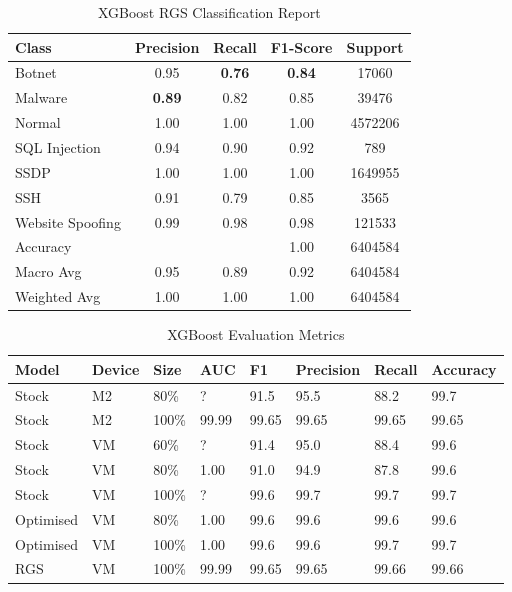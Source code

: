 \begin{table}[htbp]
  \centering
  \caption{XGBoost RGS Classification Report}
  \label{tab:optimised_xgboost}
    \begin{tabular}{lcccc}
    \toprule
    Class & Precision & Recall & F1-Score & Support \\
    \midrule
    Botnet & 0.95 & {\color{red}\bfseries 0.76} & {\color{red}\bfseries 0.84} & 17060 \\
    Malware & {\color{red}\bfseries 0.89} & 0.82 & 0.85 & 39476 \\
    Normal & 1.00 & 1.00 & 1.00 & 4572206 \\
    SQL Injection & 0.94 & 0.90 & 0.92 & 789 \\
    SSDP & 1.00 & 1.00 & 1.00 & 1649955 \\
    SSH & 0.91 & 0.79 & 0.85 & 3565 \\
    Website Spoofing & 0.99 & 0.98 & 0.98 & 121533 \\
    \midrule
    Accuracy & & & 1.00 & 6404584 \\
    Macro Avg & 0.95 & 0.89 & 0.92 & 6404584 \\
    Weighted Avg & 1.00 & 1.00 & 1.00 & 6404584 \\
    \bottomrule
    \end{tabular}%
\end{table}%



\begin{table}[h]
\centering
\caption{XGBoost Evaluation Metrics}
\label{tab:xgb-eval-metrics}
\begin{tabular}{|l|l|l|l|l|l|l|l|}
\hline
\textbf{Model} & \textbf{Device} & \textbf{Size} & \textbf{AUC} & \textbf{F1} & \textbf{Precision} & \textbf{Recall} & \textbf{Accuracy} \\ \hline
Stock & M2 & 80\% & ? & 91.5 & 95.5 & 88.2 & 99.7 \\ \hline
Stock & M2 & 100\% & 99.99 & 99.65 & 99.65 & 99.65 & 99.65 \\ \hline
Stock & VM & 60\% & ? & 91.4 & 95.0 & 88.4 & 99.6 \\ \hline
Stock & VM & 80\% & 1.00 & 91.0 & 94.9 & 87.8 & 99.6 \\ \hline
Stock & VM & 100\% & ? & 99.6 & 99.7 & 99.7 & 99.7 \\ \hline
Optimised & VM & 80\% & 1.00 & 99.6 & 99.6 & 99.6 & 99.6 \\ \hline
Optimised & VM & 100\% & 1.00 & 99.6 & 99.6 & 99.7 & 99.7 \\ \hline
RGS & VM & 100\% & 99.99 & 99.65 & 99.65 & 99.66 & 99.66 \\ \hline
\end{tabular}
\end{table}

